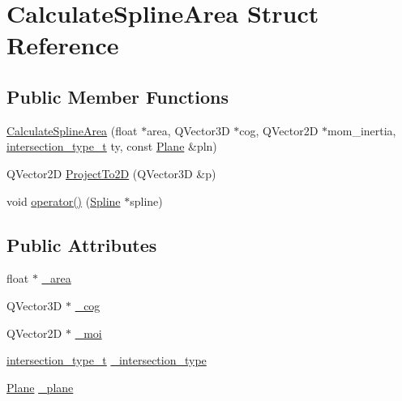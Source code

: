 \hypertarget{structCalculateSplineArea}{\section{Calculate\-Spline\-Area Struct Reference}
\label{structCalculateSplineArea}
}
\subsection*{Public Member Functions}
\begin{DoxyCompactItemize}
\item 
\hyperlink{structCalculateSplineArea_aee1b91c5b5c4e58b697aa65984864e48}{Calculate\-Spline\-Area} (float $\ast$area, Q\-Vector3\-D $\ast$cog, Q\-Vector2\-D $\ast$mom\-\_\-inertia, \hyperlink{namespaceShipCAD_aa56834b730aafdf2786ddc9a60a046fd}{intersection\-\_\-type\-\_\-t} ty, const \hyperlink{classShipCAD_1_1Plane}{Plane} \&pln)
\item 
Q\-Vector2\-D \hyperlink{structCalculateSplineArea_aa1d72cbd764c437d829a04a7c4c14d9b}{Project\-To2\-D} (Q\-Vector3\-D \&p)
\item 
void \hyperlink{structCalculateSplineArea_a55da994c2b32cad71e5c8c8f21b09ce0}{operator()} (\hyperlink{classShipCAD_1_1Spline}{Spline} $\ast$spline)
\end{DoxyCompactItemize}
\subsection*{Public Attributes}
\begin{DoxyCompactItemize}
\item 
float $\ast$ \hyperlink{structCalculateSplineArea_a2b059a1a694d22a63c94bde86a8ecd6b}{\-\_\-area}
\item 
Q\-Vector3\-D $\ast$ \hyperlink{structCalculateSplineArea_abe01c8bb84cfb1900fa06e9e16fcc575}{\-\_\-cog}
\item 
Q\-Vector2\-D $\ast$ \hyperlink{structCalculateSplineArea_a5d4eebaf188d12a2f30ed7f28bf3d57f}{\-\_\-moi}
\item 
\hyperlink{namespaceShipCAD_aa56834b730aafdf2786ddc9a60a046fd}{intersection\-\_\-type\-\_\-t} \hyperlink{structCalculateSplineArea_aae716b66f114f0217e68efc79ca9cc91}{\-\_\-intersection\-\_\-type}
\item 
\hyperlink{classShipCAD_1_1Plane}{Plane} \hyperlink{structCalculateSplineArea_ab6c7f0e103a21db017e7330a31e9f984}{\-\_\-plane}
\end{DoxyCompactItemize}


